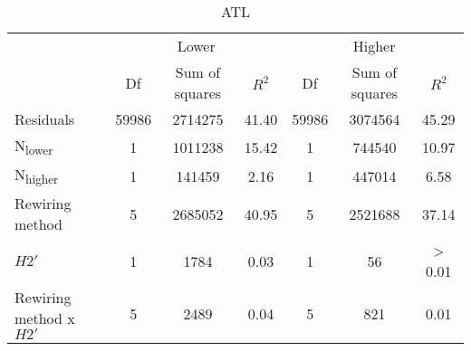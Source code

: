 \documentclass[12pt,a4paper]{article}
\begin{document}
\begin{table}
\medskip
    \begin{subtable}{\linewidth}
    \caption{ATL}
    \centering
\begin{tabularx}{\linewidth}{@{} X *6{c} @{}}
\toprule
  & \multicolumn{3}{c}{Lower} & \multicolumn{3}{c}{Higher} \\ \cmidrule(l){2-4} \cmidrule(l){5-7}
  						& Df		& Sum of squares	& $R^2$	& Df 	& Sum of squares	& $R^2$ \\ \midrule
Residuals 				& 59986 & 2714275		& 41.40	& 59986 & 3074564			& 45.29   \\
N\textsubscript{lower} 	& 1 		& 1011238 		& 15.42 	& 1		& 744540 			& 10.97  \\
N\textsubscript{higher} 	& 1 		& 141459 			& 2.16	& 1 		& 447014 			& 6.58  \\
Rewiring method 			& 5 		& 2685052 		& 40.95 	& 5 		& 2521688			& 37.14  \\
$H2'$ 					& 1 		& 1784 			& 0.03 	& 1 		& 56			& > 0.01 \\
Rewiring method x $H2'$ 	& 5 		& 2489 			& 0.04 	& 5 		& 821			& 0.01  \\ \bottomrule
\end{tabularx}

\end{subtable}

\end{table}
\end{document}
